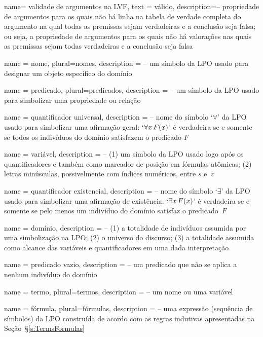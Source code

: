{
 name= validade de argumentos na LVF,
 text = válido,
 description={-- propriedade de argumentos para os quais não há linha na tabela de verdade completa do argumento na qual todas as premissas sejam verdadeiras e a conclusão seja falsa; ou seja, a propriedade de argumentos para os quais não há valorações nas quais as premissas sejam todas verdadeiras e a conclusão seja falsa}
}

{
 name = nome,
 plural=nomes,
 description = {-- um símbolo da LPO usado para designar um objeto específico do domínio}
}

{
 name = predicado,
 plural=predicados,
 description = {-- um símbolo da LPO usado para simbolizar uma propriedade ou relação}
}

{
 name = quantificador universal,
 description = {-- nome do símbolo `$\forall$' da LPO usado para simbolizar uma afirmação geral: `$\forall x\, \mathord{F}(x)$' é verdadeira se e somente se todos os indivíduos do domínio satisfazem o predicado $F$}
}

{
 name = variável,
 description = {-- (1) um símbolo da LPO usado logo após os quantificadores e também como marcador de posição em fórmulas atômicas; (2) letras minúsculas, possivelmente com índices numéricos, entre $s$ e~$z$}
}

{
 name = quantificador existencial,
 description = {-- nome do símbolo `$\exists$' da LPO usado para simbolizar uma afirmação de existência: `$\exists x\, \mathord{F}(x)$' é verdadeira se e somente se pelo menos um indivíduo do domínio satisfaz o predicado~$F$}
}

{
 name = domínio,
 description = {-- (1) a totalidade de indivíduos assumida por uma simbolização na LPO; (2) o universo do discurso; (3) a totalidade assumida como alcance das variáveis e quantificadores em uma dada interpretação}
}

{
 name = {predicado vazio},
 description = {-- um predicado que não se aplica a nenhum indivíduo do domínio}
}

{
 name = termo,
 plural=termos,
 description = {-- um nome ou uma variável}
}

{
 name = fórmula,
 plural=fórmulas,
 description = {-- uma expressão (sequência de símbolos) da LPO construída de acordo com as regras indutivas apresentadas na Seção~\S\ref{s:TermsFormulas}}
}

